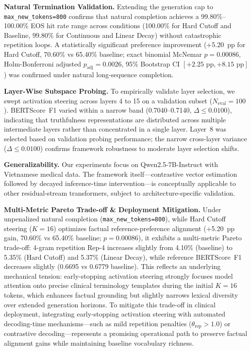 \documentclass[conference]{IEEEtran}
\begin{document}
\textbf{Natural Termination Validation.} Extending the generation cap to \texttt{max\_new\_tokens=800} confirms that natural completion achieves a 99.80\%--100.00\% EOS hit rate range across conditions (100.00\% for Hard Cutoff and Baseline, 99.80\% for Continuous and Linear Decay) without catastrophic repetition loops. A statistically significant preference improvement (+5.20~pp for Hard Cutoff, 70.60\% vs 65.40\% baseline; exact binomial McNemar $p=0.00086$, Holm-Bonferroni adjusted $p_{\text{adj}}=0.0026$, 95\% Bootstrap CI $[+2.25\text{ pp}, +8.15\text{ pp}]$) was confirmed under natural long-sequence completion.

\textbf{Layer-Wise Subspace Probing.} To empirically validate layer selection, we swept activation steering across layers 4 to 15 on a validation subset ($N_{\text{eval}}=100$). BERTScore~F1 varied within a narrow band (0.7040--0.7140, $\Delta \le 0.0100$), indicating that truthfulness representations are distributed across multiple intermediate layers rather than concentrated in a single layer. Layer~8 was selected based on validation probing performance; the narrow cross-layer variance ($\Delta \le 0.0100$) confirms framework robustness to moderate layer selection shifts.

\textbf{Generalizability.} Our experiments focus on Qwen2.5-7B-Instruct \cite{ref4} with Vietnamese medical data. The framework itself---contrastive vector estimation followed by decayed inference-time intervention---is conceptually applicable to other residual-stream transformers, subject to architecture-specific validation.

\textbf{Multi-Metric Pareto Trade-off \& Deployment Mitigation.} Under unpenalized natural completion (\texttt{max\_new\_tokens=800}), while Hard Cutoff steering ($K=16$) optimizes factual reference-preference alignment (+5.20~pp gain, 70.60\% vs 65.40\% baseline; $p=0.00086$), it exhibits a multi-metric Pareto trade-off: 4-gram repetition Rep-4 increases slightly from 4.10\% (baseline) to 5.35\% (Hard Cutoff) and 5.37\% (Linear Decay), while reference BERTScore~F1 decreases slightly (0.6695 vs 0.6779 baseline). This reflects an underlying mechanical tension: early-stopping activation steering strongly focuses model attention onto precise clinical terminology templates during the initial $K=16$ tokens, which enhances factual grounding but slightly narrows lexical diversity over extended generation horizons. To mitigate this trade-off in clinical deployment, integrating early-stopping activation steering with automated decoding-time mechanisms---such as mild repetition penalties ($\theta_{\text{rep}} > 1.0$) or contrastive decoding---represents a promising operational path to preserve factual alignment gains while maintaining baseline vocabulary richness.
\end{document}
